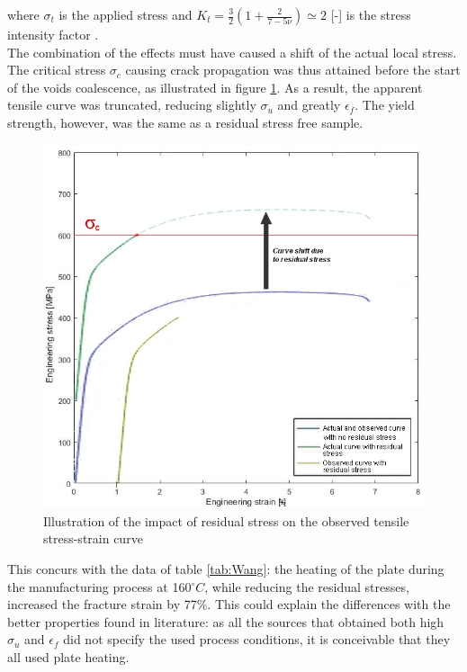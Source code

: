 where $\sigma_t$ is the applied stress and $K_t=\frac{3}{2}(1+\frac{2}{7-5\nu}) \simeq 2$ [-] is the stress intensity factor \parencite{Paris}. \\

The combination of the effects must have caused a shift of the actual local stress. The critical stress  $\sigma_c$ causing crack propagation was thus attained before the start of the voids coalescence, as illustrated in figure \ref{fig:RSTrac}. As a result, the apparent tensile curve was truncated, reducing slightly $\sigma_u$ and greatly $\epsilon_f$. The yield strength, however, was the same as a residual stress free sample. \\

\begin{figure}[ht]
	\centering
	\centerline{\includegraphics[scale=0.53]{Images/RSTrac}}
	\decoRule
	\caption[Illustration of the impact of residual stress on the observed tensile stress-strain curve]{Illustration of the impact of residual stress on the observed tensile stress-strain curve}
	\label{fig:RSTrac}
\end{figure}

This concurs with the data of table \ref{tab:Wang}: the heating of the plate during the manufacturing process at 160$^\circ C$, while reducing the residual stresses, increased the fracture strain by 77\%. This could explain the differences with the better properties found in literature: as all the sources that obtained both high $\sigma_u$ and $\epsilon_f$ did not specify the used process conditions, it is conceivable that they all used plate heating. \\


